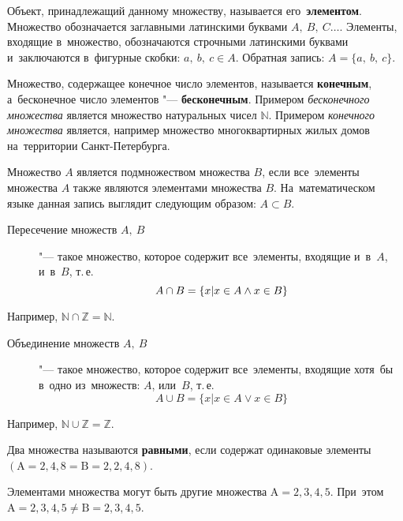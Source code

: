 \documentclass[]{scrartcl}
\begin{document}
Объект, принадлежащий данному множеству, называется его~\textbf{элементом}. Множество обозначается заглавными латинскими буквами ${\textstyle{A},\ B,\ C\ldots}$. Элементы, входящие в~множество, обозначаются строчными латинскими буквами и~заключаются в~фигурные скобки: ${\textstyle a,\ b,\ c \in A}$. Обратная запись: ${\textstyle A=\{a,\ b,\ c\}}$.

Множество, содержащее конечное число элементов, называется \textbf{конечным}, а~бесконечное число элементов "--- \textbf{бесконечным}. Примером \emph{бесконечного множества} является множество натуральных чисел ${\textstyle \mathbb{N}}$. Примером \emph{конечного множества} является, например множество многоквартирных жилых домов на~территории Санкт-Петербурга.

Множество ${\textstyle A}$ является подмножеством множества ${\textstyle B}$, если все~элементы множества ${\textstyle A}$ также являются элементами множества ${\textstyle B}$. На~математическом языке данная запись выглядит следующим образом: ${\textstyle A\subset B}$.

\begin{description}
	\item[Пересечение множеств ${\textstyle A,\ B}$] "--- такое множество, которое содержит все~элементы, входящие и~в~${\textstyle A}$, и~в~${\textstyle B}$, т.\,е.
	\begin{equation}\label{eq:sets-intercept}
	A\cap B = \{x\arrowvert x \in A \wedge x \in B\}
	\end{equation}
\end{description}
Например, ${\textstyle \mathbb{N} \cap \mathbb{Z} = \mathbb{N}}$.
\begin{description}
	\item[Объединение множеств ${\textstyle A,\ B}$] "--- такое множество, которое содержит все~элементы, входящие хотя~бы в~одно из~множеств: ${\textstyle A}$, или~${\textstyle B}$, т.\,е.
	\begin{equation}\label{eq:sets-join}
	A\cup B = \{x|x \in A \vee x \in B\}
	\end{equation}
\end{description}
Например, ${\textstyle \mathbb{N} \cup \mathbb{Z} = \mathbb{Z}}$.

Два множества называются \textbf{равными}, если содержат одинаковые элементы ${(\text{A}={2,4,8}=\text{B}={2,2,4,8})}$.

Элементами множества могут быть другие множества ${\text{A}={{2,3},{4,5}}}$. При~этом ${\text{A}={{2,3},{4,5}}\neq \text{B}= {2,3,4,5}}$.
\end{document}
